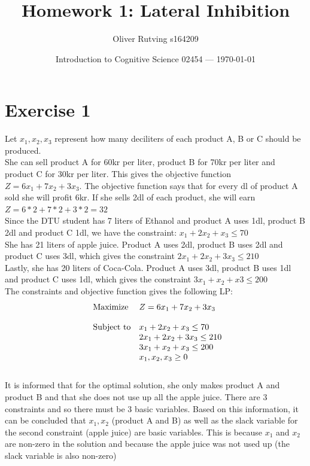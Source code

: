 \documentclass{article}
\title{Homework 1: Lateral Inhibition} %
\author{Oliver Rutving s164209} %
\date{Introduction to Cognitive Science 02454 --- \today} %
\begin{document}
\maketitle %


\section{Exercise 1} %
Let $x_1, x_2, x_3$ represent how many deciliters of each product A, B or C should be produced. 
\\
She can sell product A for 60kr per liter, product B for 70kr per liter and product C for 30kr per liter. This gives the objective function $Z=6x_1+7x_2+3x_3$. 
The objective function says that for every dl of product A sold she will profit 6kr. If she sells 2dl of each product, she will earn $Z=6*2+7*2+3*2=32$
\\
Since the DTU student has 7 liters of Ethanol and product A uses 1dl, product B 2dl and product C 1dl, we have the constraint: $x_1+2x_2+x_3\leq 70$
\\
She has 21 liters of apple juice. Product A uses 2dl, product B uses 2dl and product C uses 3dl, which gives the constraint $2x_1+2x_2+3x_3\leq 210$
\\
Lastly, she has 20 liters of Coca-Cola. Product A uses 3dl, product B uses 1dl and product C uses 1dl, which gives the constraint $3x_1+x_2+x3\leq 200$
\\
The constraints and objective function gives the following LP:
\\
\begin{equation*}
    \begin{array}{ll@{}ll}
    \text{Maximize}  & Z=6x_1+7x_2+3x_3\\
                     & \\
    \text{Subject to}& x_1+2x_2+x_3\leq 70\\
                     & 2x_1+2x_2+3x_3\leq 210\\
                     & 3x_1+x_2+x_3\leq 200\\
                     & x_1, x_2, x_3 \geq 0
\end{array}
\end{equation*}
\\
It is informed that for the optimal solution, she only makes product A and product B and that she does not use up all the apple juice.
There are 3 constraints and so there must be 3 basic variables.
Based on this information, it can be concluded that $x_1, x_2$ (product A and B) as well as the slack variable for the second constraint (apple juice) are basic variables. 
This is because $x_1$ and $x_2$ are non-zero in the solution and because the apple juice was not used up (the slack variable is also non-zero)
\end{document}
